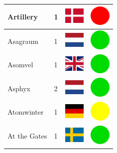 \documentclass[12pt, a4paper, twoside]{report}
\begin{document}
\begin{center}
\begin{longtable}{|p{5cm}|p{2cm}|p{2cm}|p{2cm}|}
			Artillery & 1 & \includegraphics[width=1cm]{4x3/dk} & \includegraphics[width=1cm]{likes/n} \\ \hline
			Asagraum & 1 & \includegraphics[width=1cm]{4x3/nl} & \includegraphics[width=1cm]{likes/y} \\ \hline
			Asomvel & 1 & \includegraphics[width=1cm]{4x3/gb} & \includegraphics[width=1cm]{likes/y} \\ \hline
			Asphyx & 2 & \includegraphics[width=1cm]{4x3/nl} & \includegraphics[width=1cm]{likes/y} \\ \hline
			Atomwinter & 1 & \includegraphics[width=1cm]{4x3/de} & \includegraphics[width=1cm]{likes/m} \\ \hline
			At the Gates & 1 & \includegraphics[width=1cm]{4x3/se} & \includegraphics[width=1cm]{likes/y} \\ \hline

\end{longtable}
\end{center}
\end{document}

